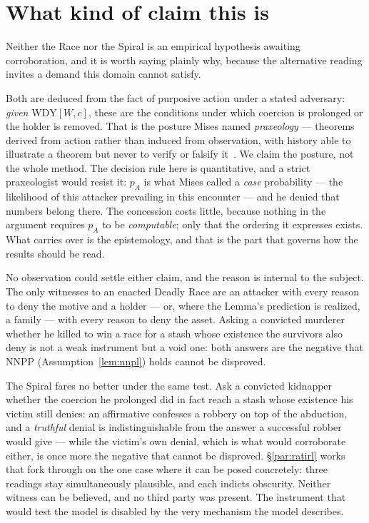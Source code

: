 \section{What kind of claim this is}
\label{sec:method}

\begin{remark}\label{rem:praxeology}
Neither the Race nor the Spiral is an empirical hypothesis awaiting corroboration, and
it is worth saying plainly why, because the alternative reading invites a demand this
domain cannot satisfy.

Both are deduced from the fact of purposive action under a stated adversary: \emph{given}
$\mathrm{WDY}[W,c]$, these are the conditions under which coercion is prolonged or the
holder is removed. That is the posture Mises named \emph{praxeology} --- theorems derived
from action rather than induced from observation, with history able to illustrate a
theorem but never to verify or falsify it~\cite{mises-human-action}. We claim the
posture, not the whole method. The decision rule here is quantitative, and a strict
praxeologist would resist it: $p_A$ is what Mises called a \emph{case} probability --- the
likelihood of this attacker prevailing in this encounter --- and he denied that numbers
belong there. The concession costs little, because nothing in the argument requires
$p_A$ to be \emph{computable}; only that the ordering it expresses exists. What carries
over is the epistemology, and that is the part that governs how the results should be
read.

No observation could settle either claim, and the reason is internal to the subject. The
only witnesses to an enacted Deadly Race are an attacker with every reason to deny the
motive and a holder --- or, where the Lemma's prediction is realized, a family --- with
every reason to deny the asset. Asking a convicted murderer whether he killed to win a
race for a stash whose existence the survivors also deny is not a weak instrument but a
void one: both answers are the negative that NNPP (Assumption~\ref{lem:nnpl}) holds
cannot be disproved.

The Spiral fares no better under the same test. Ask a convicted kidnapper whether the
coercion he prolonged did in fact reach a stash whose existence his victim still denies:
an affirmative confesses a robbery on top of the abduction, and a \emph{truthful} denial
is indistinguishable from the answer a successful robber would give --- while the
victim's own denial, which is what would corroborate either, is once more the negative
that cannot be disproved. \S\ref{par:ratirl} works that fork through on the one case
where it can be posed concretely: three readings stay simultaneously plausible, and each
indicts obscurity. Neither witness can be believed, and no third party was present.
The instrument that would test the model is disabled by the very mechanism the model
describes.


\end{remark}

